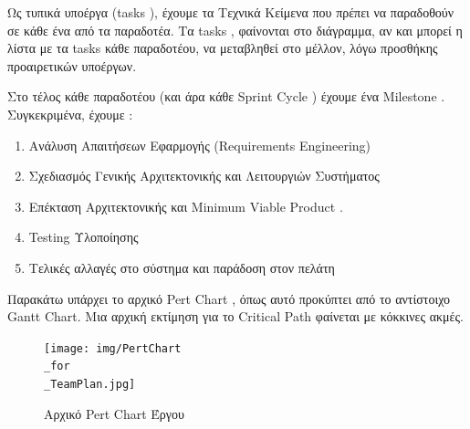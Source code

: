 \documentclass{../ol-softwaremanual}
\begin{document}
		Ως τυπικά υποέργα (\en tasks \gr), έχουμε τα Τεχνικά Κείμενα που πρέπει να παραδοθούν σε κάθε ένα από τα παραδοτέα. Τα \en tasks \gr, φαίνονται στο διάγραμμα, αν και μπορεί η λίστα με τα \en tasks \gr κάθε παραδοτέου, να μεταβληθεί στο μέλλον, λόγω προσθήκης προαιρετικών υποέργων. 
		
		Στο τέλος κάθε παραδοτέου (και άρα κάθε \en Sprint Cycle \gr) έχουμε ένα \en Milestone \gr. Συγκεκριμένα, έχουμε :
		
		\begin{enumerate}
			\item Ανάλυση Απαιτήσεων Εφαρμογής (\en Requirements Engineering\gr)
			\item Σχεδιασμός Γενικής Αρχιτεκτονικής και Λειτουργιών Συστήματος
			\item  Επέκταση Αρχιτεκτονικής και \en Minimum Viable Product \gr.
			\item \en Testing \gr Υλοποίησης
			\item Τελικές αλλαγές στο σύστημα και παράδοση στον πελάτη
		\end{enumerate}
		\newpage
		
		
		\flushleft
		Παρακάτω υπάρχει το αρχικό \en Pert Chart \gr, όπως αυτό προκύπτει από το αντίστοιχο \en Gantt Chart\gr. Μια αρχική εκτίμηση για το \en Critical Path \gr φαίνεται με κόκκινες ακμές.
		
		\begin{figure}[htbp!]
			
			\texttt{[image: img/PertChart\\\_for\\\_TeamPlan.jpg]}
						\caption{Αρχικό \en Pert Chart \gr Έργου}
		\end{figure}
	


	
\end{document}
